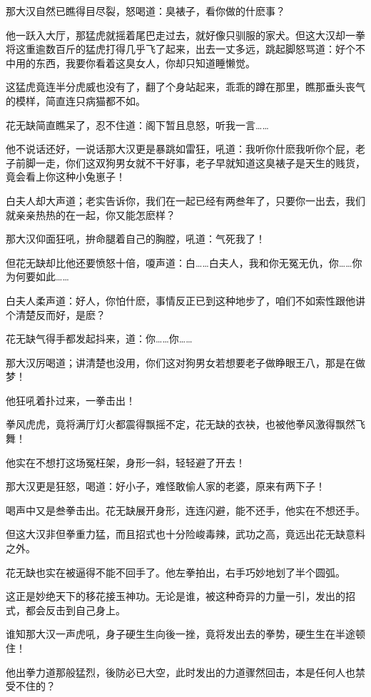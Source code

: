 \documentclass[12pt,oneside]{book}
\begin{document}
那大汉自然已瞧得目尽裂，怒喝道：臭裱子，看你做的什麽事？

他一跃入大厅，那猛虎就摇着尾巴走过去，就好像只驯服的家犬。但这大汉却一拳将这重逾数百斤的猛虎打得几乎飞了起来，出去一丈多远，跳起脚怒骂道：好个不中用的东西，我要你看着这臭女人，你却只知道睡懒觉。

这猛虎竟连半分虎威也没有了，翻了个身站起来，乖乖的蹲在那里，瞧那垂头丧气的模样，简直连只病猫都不如。

花无缺简直瞧呆了，忍不住道：阁下暂且息怒，听我一言\ldots\ldots{}

他不说话还好，一说话那大汉更是暴跳如雷狂，吼道：我听你什麽我听你个屁，老子前脚一走，你们这双狗男女就不干好事，老子早就知道这臭裱子是天生的贱货，竟会看上你这种小兔崽子！

白夫人却大声道；老实告诉你，我们在一起已经有两叁年了，只要你一出去，我们就亲亲热热的在一起，你又能怎麽样？

那大汉仰面狂吼，拚命腿着自己的胸膛，吼道：气死我了！

但花无缺却比他还要愤怒十倍，嗄声道：白\ldots\ldots 白夫人，我和你无冤无仇，你\ldots\ldots 你为何要如此\ldots\ldots{}

白夫人柔声道：好人，你怕什麽，事情反正已到这种地步了，咱们不如索性跟他讲个清楚反而好，是麽？

花无缺气得手都发起抖来，道：你\ldots\ldots 你\ldots\ldots{}

那大汉厉喝道；讲清楚也没用，你们这对狗男女若想要老子做睁眼王八，那是在做梦！

他狂吼着扑过来，一拳击出！

拳风虎虎，竟将满厅灯火都震得飘摇不定，花无缺的衣袂，也被他拳风激得飘然飞舞！

他实在不想打这场冤枉架，身形一斜，轻轻避了开去！

那大汉更是狂怒，喝道：好小子，难怪敢偷人家的老婆，原来有两下子！

喝声中又是叁拳击出。花无缺展开身形，连连闪避，能不还手，他实在不想还手。

但这大汉非但拳重力猛，而且招式也十分险峻毒辣，武功之高，竟远出花无缺意料之外。

花无缺也实在被逼得不能不回手了。他左拳拍出，右手巧妙地划了半个圆弧。

这正是妙绝天下的移花接玉神功。无论是谁，被这种奇异的力量一引，发出的招式，都会反击到自己身上。

谁知那大汉一声虎吼，身子硬生生向後一挫，竟将发出去的拳势，硬生生在半途顿住！

他出拳力道那般猛烈，後防必已大空，此时发出的力道骤然回击，本是任何人也禁受不住的？
\end{document}
